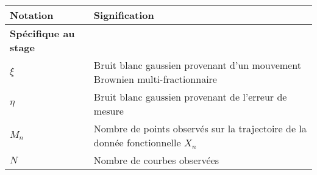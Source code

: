 \begin{table}[H]
	\centering
	\begin{tabularx}{\textwidth}{lX}
		\toprule
		\textbf{Notation}                                                                               & \textbf{Signification}                                                                                                                                                                                                                                                                                                                      \\
		\midrule
		\textbf{Spécifique au stage}                                                                                                                                                                                                                                                                                                                                                                                                                  \\
		\midrule
		$\xi$                                                                                           & Bruit blanc gaussien provenant d'un mouvement Brownien multi-fractionnaire                                                                                                                                                                                                                                                                  \\
		$\eta$                                                                                          & Bruit blanc gaussien provenant de l'erreur de mesure                                                                                                                                                                                                                                                                                        \\
		\midrule
		$M_n$                                                                                           & Nombre de points observés sur la trajectoire de la donnée fonctionnelle $X_n$                                                                                                                                                                                                                                                               \\
		$N$                                                                                             & Nombre de courbes observées                                                                                                                                                                                                                                                                                                                 \\

\end{tabularx}
\end{table}
